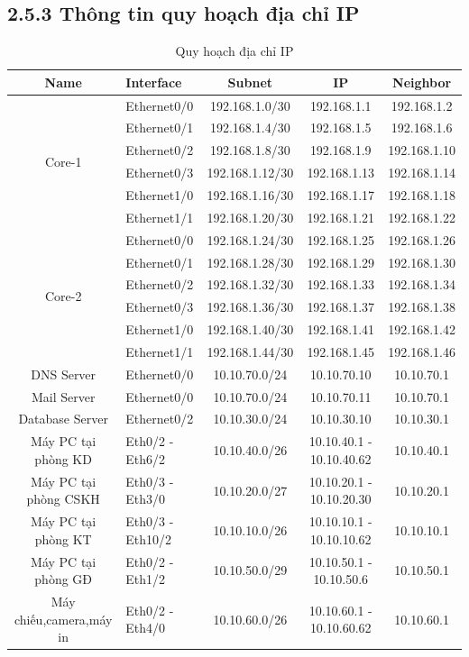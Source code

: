\subsection*{2.5.3 Thông tin quy hoạch địa chỉ IP}

\begin{table}[htbp]
\centering
\begin{tabular}{|c|l|c|c|c|}
\hline
\textbf{Name} & \textbf{Interface} & \textbf{Subnet} & \textbf{IP} & \textbf{Neighbor} \\
\hline
\multirow{6}{*}{Core-1} & Ethernet0/0 & 192.168.1.0/30 & 192.168.1.1 & 192.168.1.2 \\
\cline{2-5}
& Ethernet0/1 & 192.168.1.4/30 & 192.168.1.5 & 192.168.1.6 \\
\cline{2-5}
& Ethernet0/2 & 192.168.1.8/30 & 192.168.1.9 & 192.168.1.10 \\
\cline{2-5}
& Ethernet0/3 & 192.168.1.12/30 & 192.168.1.13 & 192.168.1.14 \\
\cline{2-5}
& Ethernet1/0 & 192.168.1.16/30 & 192.168.1.17 & 192.168.1.18 \\
\cline{2-5}
& Ethernet1/1 & 192.168.1.20/30 & 192.168.1.21 & 192.168.1.22 \\
\hline
\multirow{6}{*}{Core-2} & Ethernet0/0 & 192.168.1.24/30 & 192.168.1.25 & 192.168.1.26 \\
\cline{2-5}
& Ethernet0/1 & 192.168.1.28/30 & 192.168.1.29 & 192.168.1.30 \\
\cline{2-5}
& Ethernet0/2 & 192.168.1.32/30 & 192.168.1.33 & 192.168.1.34 \\
\cline{2-5}
& Ethernet0/3 & 192.168.1.36/30 & 192.168.1.37 & 192.168.1.38 \\
\cline{2-5}
& Ethernet1/0 & 192.168.1.40/30 & 192.168.1.41 & 192.168.1.42 \\
\cline{2-5}
& Ethernet1/1 & 192.168.1.44/30 & 192.168.1.45 & 192.168.1.46 \\
\hline
DNS Server &Ethernet0/0  & 10.10.70.0/24 &10.10.70.10 & 10.10.70.1 \\
\hline
Mail Server &Ethernet0/0  & 10.10.70.0/24 &10.10.70.11 & 10.10.70.1 \\
\hline
Database Server &Ethernet0/2& 10.10.30.0/24 &10.10.30.10 & 10.10.30.1 \\
\hline
Máy PC tại phòng KD &Eth0/2 - Eth6/2  & 10.10.40.0/26 &10.10.40.1 - 10.10.40.62 &10.10.40.1 \\
\hline
Máy PC tại phòng CSKH &Eth0/3 - Eth3/0  & 10.10.20.0/27 &10.10.20.1 - 10.10.20.30 & 10.10.20.1 \\
\hline
Máy PC tại phòng KT &Eth0/3 - Eth10/2  & 10.10.10.0/26 &10.10.10.1 - 10.10.10.62 & 10.10.10.1 \\
\hline
Máy PC tại phòng GĐ &Eth0/2 - Eth1/2  & 10.10.50.0/29 &10.10.50.1 - 10.10.50.6 & 10.10.50.1 \\
\hline
Máy chiếu,camera,máy in&Eth0/2 - Eth4/0  & 10.10.60.0/26 &10.10.60.1 - 10.10.60.62 &10.10.60.1 \\
\hline
\end{tabular}
\caption{Quy hoạch địa chỉ IP}
\label{tab:network-config}
\end{table}

